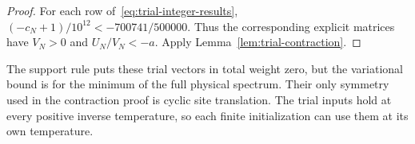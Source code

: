 \begin{proof}
For each row of~\eqref{eq:trial-integer-results},
$(-c_N+1)/10^{12}<-700741/500000$.
Thus the corresponding explicit matrices have $V_N>0$ and
$U_N/V_N<-a$. Apply Lemma~\ref{lem:trial-contraction}.
\end{proof}

The support rule puts these trial vectors in total weight zero, but the
variational bound is for the minimum of the full physical spectrum.
Their only symmetry used in the contraction proof is cyclic site
translation. The trial inputs hold at every positive inverse
temperature, so each finite initialization can use them at its own
temperature.

